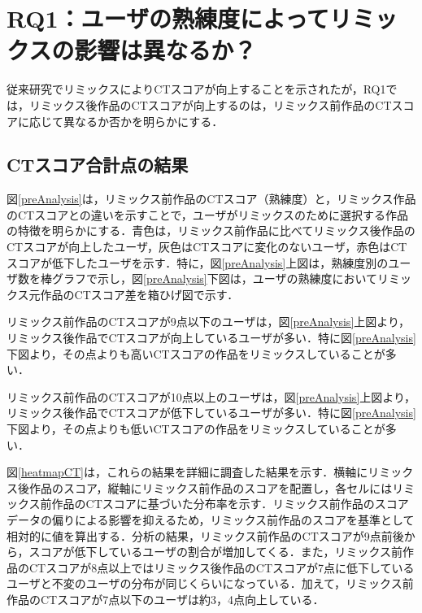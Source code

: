 \documentclass[submit,techrep,noauthor]{ipsj}
\begin{document}
\section{RQ1：ユーザの熟練度によってリミックスの影響は異なるか？}
\label{sec:rq1}

従来研究\cite{10.1145/2724660.2724674}\cite{hashitani2022scratch}\cite{10.1145/2818048.2819984}でリミックスによりCTスコアが向上することを示されたが，RQ1では，リミックス後作品のCTスコアが向上するのは，リミックス前作品のCTスコアに応じて異なるか否かを明らかにする．

\subsection{CTスコア合計点の結果}

図\ref{preAnalysis}は，リミックス前作品のCTスコア（熟練度）と，リミックス作品のCTスコアとの違いを示すことで，ユーザがリミックスのために選択する作品の特徴を明らかにする．青色は，リミックス前作品に比べてリミックス後作品のCTスコアが向上したユーザ，灰色はCTスコアに変化のないユーザ，赤色はCTスコアが低下したユーザを示す．特に，図\ref{preAnalysis}上図は，熟練度別のユーザ数を棒グラフで示し，図\ref{preAnalysis}下図は，ユーザの熟練度においてリミックス元作品のCTスコア差を箱ひげ図で示す．


リミックス前作品のCTスコアが9点以下のユーザは，図\ref{preAnalysis}上図より，リミックス後作品でCTスコアが向上しているユーザが多い．特に図\ref{preAnalysis}下図より，その点よりも高いCTスコアの作品をリミックスしていることが多い．

リミックス前作品のCTスコアが10点以上のユーザは，図\ref{preAnalysis}上図より，リミックス後作品でCTスコアが低下しているユーザが多い．特に図\ref{preAnalysis}下図より，その点よりも低いCTスコアの作品をリミックスしていることが多い．

図\ref{heatmapCT}は，これらの結果を詳細に調査した結果を示す．横軸にリミックス後作品のスコア，縦軸にリミックス前作品のスコアを配置し，各セルにはリミックス前作品のCTスコアに基づいた分布率を示す．リミックス前作品のスコアデータの偏りによる影響を抑えるため，リミックス前作品のスコアを基準として相対的に値を算出する．分析の結果，リミックス前作品のCTスコアが9点前後から，スコアが低下しているユーザの割合が増加してくる．また，リミックス前作品のCTスコアが8点以上ではリミックス後作品のCTスコアが7点に低下しているユーザと不変のユーザの分布が同じくらいになっている．加えて，リミックス前作品のCTスコアが7点以下のユーザは約3，4点向上している．
\end{document}
